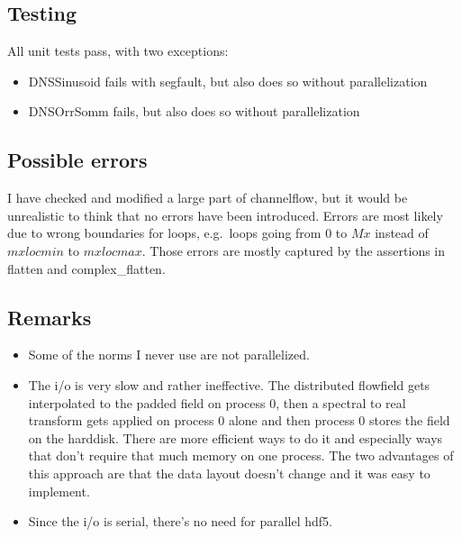 \documentclass[a4paper,10pt,DIV=16]{scrartcl}
\begin{document}
\subsection{Testing}
All unit tests pass, with two exceptions:
\begin{itemize}
  \item DNSSinusoid fails with segfault, but also does so without parallelization
  \item DNSOrrSomm fails, but also does so without parallelization
\end{itemize}


\subsection{Possible errors}
I have checked and modified a large part of channelflow, but it would be unrealistic to think that no errors have been introduced.
Errors are most likely due to wrong boundaries for loops, e.g.\ loops going from $0$ to $Mx$ instead of $mxlocmin$ to $mxlocmax$.
Those errors are mostly captured by the assertions in flatten and complex\_flatten.

\subsection{Remarks}
\begin{itemize}
  \item Some of the norms I never use are not parallelized.
  \item The i/o is very slow and rather ineffective. The distributed flowfield gets interpolated to the padded field on process 0, then a spectral to real transform gets applied on process 0 alone and then process 0 stores the field on the harddisk. There are more efficient ways to do it and especially ways that don't require that much memory on one process. The two advantages of this approach are that the data layout doesn't change and it was easy to implement.
  \item Since the i/o is serial, there's no need for parallel hdf5.
\end{itemize}
\end{document}
